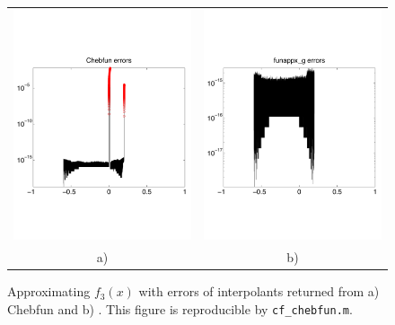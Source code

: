 \begin{exmp}
\begin{figure}[t]
\centering
\begin{tabular}{cc}
\includegraphics[width=5.9cm]{figure/chebfun_errors.pdf} \hspace{-2ex} &
\includegraphics[width=5.9cm]{figure/funappx_g_errors.pdf}
\\ a) & b)
\end{tabular}
\caption{Approximating $f_3(x)$ with errors of interpolants returned from a)
Chebfun and b) \funappxg. This figure is reproducible by
\texttt{cf\_chebfun.m}.}
\label{f3fig}
\end{figure}
\end{exmp}

